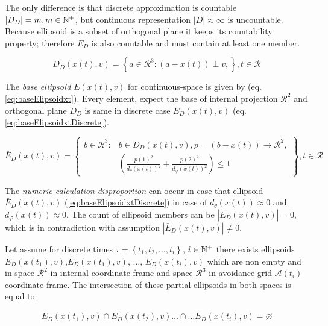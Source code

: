 The only difference is that discrete approximation is countable $|D_D|=m,m\in\mathbb{N}^+$, but continuous representation $|D|\approx \infty$ is uncountable. Because ellipsoid is a subset of orthogonal plane it keeps its countability property; therefore $E_D$ is also countable and must contain at least one member.

\begin{equation}\label{eq:elisioidalOtrthogonalPlaneDiscrete}
    D_D({x}(t),{v})=\left\{{a}\in\mathscr{R}^3:({a}-{x}(t))\perp{v},\right\},t\in\mathscr{R}
\end{equation}

\noindent The \emph{base ellipsoid} $E({x}(t),{v})$ for continuous-space is given by (eq. \ref{eq:baseElipsoidxt}). Every element, expect the base of internal projection $\mathscr{R}^2$ and orthogonal plane $D_D$ is same in discrete case $E_D({x}(t),{v})$ (eq. \ref{eq:baseElipsoidxtDiscrete}).

\begin{equation}\label{eq:baseElipsoidxtDiscrete}
    \bar{E}_D({x}(t),{v})=\left\{ \begin{aligned}{b}\in\mathscr{R}^3:&{b}\in D_D({x}(t),{v}),{p}=({b}-{x}(t))\to\mathscr{R}^2,\\&\left(\frac{p(1)^2} {d_\theta({x}(t))^2}+ \frac{p(2)^2}{d_\varphi({x}(t))^2}\right)\le 1\end{aligned}\right\},t\in\mathscr{R}
\end{equation}

\noindent The \emph{numeric calculation disproportion} can occur in case that ellipsoid $\bar{E}_D({x}(t),{v})$ (\ref{eq:baseElipsoidxtDiscrete}) in case of $d_\theta({x}(t))\approx 0$ and $d_\varphi({x}(t))\approx 0$. The count of ellipsoid members can be $|\bar{E}_D({x}(t),{v})|=0$, which is in contradiction with assumption $|\bar{E}_D({x}(t),{v})|\neq 0$. 

Let assume for discrete times $\tau=\left\{t_1,t_2,\dots,t_i\right\}$, $i\in \mathbb{N}^+$ there exists ellipsoids $\bar{E}_D({x}(t_1),{v})$,$\bar{E}_D({x}(t_1),{v})$, $\dots$, $\bar{E}_D({x}(t_i),{v})$ which are non empty and in space $\mathscr{R}^2$ in internal coordinate frame and space $\mathscr{R}^3$ in avoidance grid $\mathscr{A}(t_i)$ coordinate frame. The intersection of these partial ellipsoids in both spaces is equal to:

\begin{equation}
    \bar{E}_D({x}(t_1),{v})\cap \bar{E}_D({x}(t_2),{v})\dots\cap\dots \bar{E}_D({x}(t_i),{v}) = \varnothing
\end{equation}

